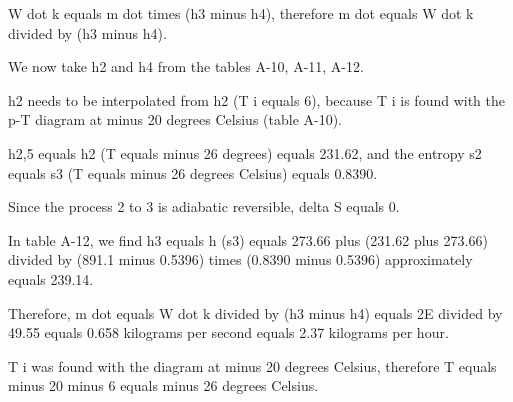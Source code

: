 W dot k equals m dot times (h3 minus h4), therefore m dot equals W dot k divided by (h3 minus h4).

We now take h2 and h4 from the tables A-10, A-11, A-12.

h2 needs to be interpolated from h2 (T i equals 6), because T i is found with the p-T diagram at minus 20 degrees Celsius (table A-10).

h2,5 equals h2 (T equals minus 26 degrees) equals 231.62, and the entropy s2 equals s3 (T equals minus 26 degrees Celsius) equals 0.8390.

Since the process 2 to 3 is adiabatic reversible, delta S equals 0.

In table A-12, we find h3 equals h (s3) equals 273.66 plus (231.62 plus 273.66) divided by (891.1 minus 0.5396) times (0.8390 minus 0.5396) approximately equals 239.14.

Therefore, m dot equals W dot k divided by (h3 minus h4) equals 2E divided by 49.55 equals 0.658 kilograms per second equals 2.37 kilograms per hour.

T i was found with the diagram at minus 20 degrees Celsius, therefore T equals minus 20 minus 6 equals minus 26 degrees Celsius.